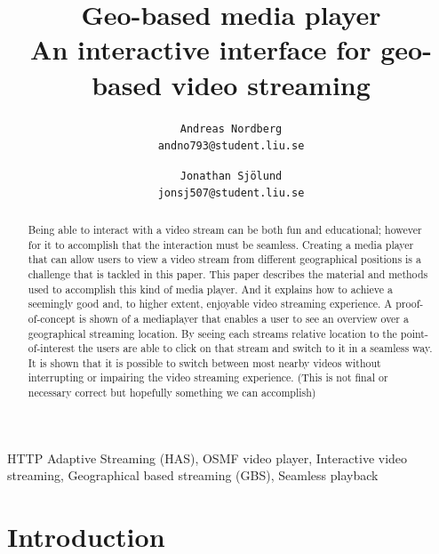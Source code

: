 \documentclass[9pt,a4paper]{acmproc}
\author{
\texttt{Andreas Nordberg}\\
\texttt{andno793@student.liu.se}
  \and
  \texttt{Jonathan Sjölund}\\
  \texttt{jonsj507@student.liu.se}
}
\begin{document}
\title{%
	Geo-based media player \\
	\large An interactive interface for geo-based video streaming}
\maketitle

{}

\begin{abstract}
Being able to interact with a video stream can be both fun and educational; however for it to accomplish that the interaction must be seamless. Creating a media player that can allow users to view a video stream from different geographical positions is a challenge that is tackled in this paper. This paper describes the material and methods used to accomplish this kind of media player. And it explains how to achieve a seemingly good and, to higher extent, enjoyable video streaming experience. A proof-of-concept is shown of a mediaplayer that enables a user to see an overview over a geographical streaming location. By seeing each streams relative location to the point-of-interest the users are able to click on that stream and switch to it in a seamless way. It is shown that it is possible to switch between most nearby videos without interrupting or impairing the video streaming experience. (This is not final or necessary correct but hopefully something we can accomplish)

\end{abstract}

\begin{keywords}
HTTP Adaptive Streaming (HAS), OSMF video player, Interactive video streaming, Geographical based streaming (GBS), Seamless playback
\end{keywords}

\section{Introduction} 
\end{document}
